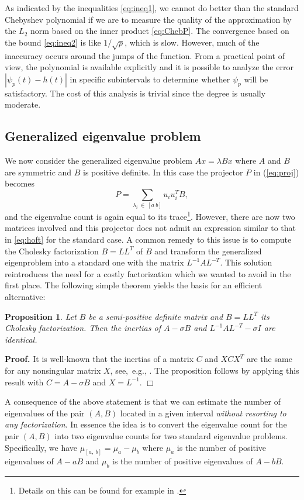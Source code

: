 \documentclass[12pt]{article}		\usepackage{tabls,multirow}
\newtheorem{proposition}{Proposition}[section]
\newenvironment{proof}{\begin{trivlist}
                       \item[]{\bf Proof.}
                       \hspace{0cm} }{\hfill $\Box$
                       \end{trivlist}}
\newcommand{\ab}{[a, \ b]}
\def\inv{^{-1}}\def\backw{{\bf B}}\def\diag{\mbox{Diag}\,}
\def\nref#1{(\ref{#1})}
\newcommand{\eq}[1]{\begin{equation}\label{#1}}
\newcommand{\en}{\end{equation}}
\begin{document}
As indicated by the inequalities \eqref{eq:ineq1}, we cannot do better
than the standard Chebyshev polynomial if we are to measure the
quality of the approximation by the $L_2$ norm based on the inner
product \eqref{eq:ChebP}. The convergence based on the bound
\eqref{eq:ineq2} is like $1/\sqrt{p}$, which is slow. However, much of
the inaccuracy occurs around the jumps of the function.  From a
practical point of view, the polynomial is available explicitly and it
is possible to analyze the error $ | \psi_p(t) - h(t) | $ in specific
subintervals to determine whether $\psi_p$ will be satisfactory. The
cost of this analysis is trivial since the degree is usually moderate.


\subsection{Generalized eigenvalue problem}
We now consider the generalized eigenvalue problem $Ax=\lambda Bx$ where
$A$ and $B$ are symmetric and $B$ is positive definite. In this case
the projector $P$ in \nref{eq:proj} becomes
\eq{eq:projG}
P = \sum_{\lambda_i \ \in \ [a  \ b]} u_i u_i^T B , 
\en 
and the eigenvalue count is again equal to its trace\footnote{Details on this can be found for example in \cite{Kramer-al-FEAST-2013}.}.
However, there are now two matrices involved and
 this projector does not admit an expression similar to that in
\eqref{eq:hoft} for  the standard case.
A common remedy to this issue is to compute the Cholesky factorization
$B=LL^T$ of $B$ and transform the generalized eigenproblem into a
standard one with the matrix $L^{-1} AL^{-T}$. This solution
reintroduces the need for a costly factorization which we wanted to
avoid in the first place. The following simple theorem yields the
basis for an efficient alternative:
\begin{proposition} 
  Let $B$ be a semi-positive definite matrix and $B = L L^T$ its
  Cholesky factorization.  Then the inertias of $A - \sigma B$ and $L
  \inv A L^{-T}- \sigma I$ are identical.
\end{proposition} 
\begin{proof}
It is well-known that the inertias of a matrix $C$ and 
$X C X^T $ are the same for any nonsingular matrix $X$, see,\
e.g., \cite{GVL-book}. The proposition follows by applying
 this result with $C = A - \sigma B$ and $X = L\inv$.
\end{proof}

A consequence of the above statement is that we can estimate
the number of eigenvalues of the pair $(A, B)$ located in a given
interval \emph{without resorting to any factorization}. 
In essence the idea is to convert the eigenvalue count for the pair 
$(A,B)$ into two eigenvalue counts for two standard eigenvalue
problems. Specifically, we have $\mu_{\ab} = \mu_a -\mu_b$ where
 $\mu_a$ is the number of positive 
eigenvalues of $A - a B$ and $\mu_b$ is
the number of positive eigenvalues of $A - b B $.
\end{document}
